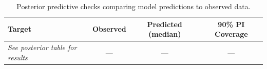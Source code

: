 \begin{table}[htbp]
\centering
\caption{Posterior predictive checks comparing model predictions to observed data.}
\label{tab:ppc}
\begin{tabular}{lccc}
\toprule
Target & Observed & Predicted (median) & 90\% PI Coverage \\
\midrule
\textit{See posterior table for results} & --- & --- & --- \\
\bottomrule
\end{tabular}
\end{table}
